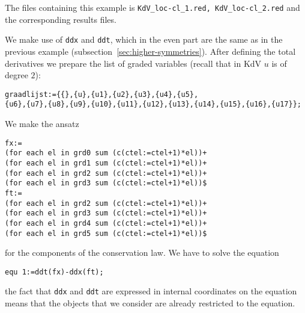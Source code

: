 \documentclass[12pt]{amsart}
\theoremstyle{definition}
\begin{document}
The files containing this example is \texttt{KdV\_loc-cl\_1.red,
  KdV\_loc-cl\_2.red} and the corresponding results files.

We make use of \texttt{ddx} and \texttt{ddt}, which in the even part are the
same as in the previous example (subsection~\ref{sec:higher-symmetries}).
After defining the total derivatives we prepare the list of graded variables
(recall that in KdV $u$ is of degree $2$):
\begin{verbatim}
graadlijst:={{},{u},{u1},{u2},{u3},{u4},{u5},
{u6},{u7},{u8},{u9},{u10},{u11},{u12},{u13},{u14},{u15},{u16},{u17}};
\end{verbatim}
We make the ansatz
\begin{verbatim}
fx:=
(for each el in grd0 sum (c(ctel:=ctel+1)*el))+
(for each el in grd1 sum (c(ctel:=ctel+1)*el))+
(for each el in grd2 sum (c(ctel:=ctel+1)*el))+
(for each el in grd3 sum (c(ctel:=ctel+1)*el))$
ft:=
(for each el in grd2 sum (c(ctel:=ctel+1)*el))+
(for each el in grd3 sum (c(ctel:=ctel+1)*el))+
(for each el in grd4 sum (c(ctel:=ctel+1)*el))+
(for each el in grd5 sum (c(ctel:=ctel+1)*el))$
\end{verbatim}
for the components of the conservation law. We have to solve the equation
\begin{verbatim}
equ 1:=ddt(fx)-ddx(ft);
\end{verbatim}
the fact that \texttt{ddx} and \texttt{ddt} are expressed in internal
coordinates on the equation means that the objects that we consider are already
restricted to the equation.
\end{document}

